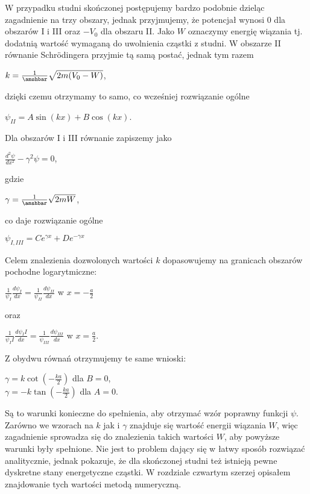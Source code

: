 \documentclass{SGGW-thesis}
\begin{document}
W przypadku studni skończonej postępujemy bardzo podobnie dzieląc zagadnienie na trzy obszary, jednak przyjmujemy, że potencjał wynosi 0 dla obszarów I i III oraz $-V_0$ dla obszaru II. Jako $W$ oznaczymy energię wiązania tj. dodatnią wartość wymaganą do uwolnienia cząstki z studni. W obszarze II równanie Schrödingera przyjmie tą samą postać, jednak tym razem
\begin{center}
$k=\frac{1}{\amshbar}\sqrt{2m(V_0-W)}$,
\end{center}
dzięki czemu otrzymamy to samo, co wcześniej rozwiązanie ogólne 
\begin{center}
$\psi_{II}=A\sin(kx)+B\cos(kx)$.
\end{center}
Dla obszarów I i III równanie zapiszemy jako
\begin{center}
$\frac{d^2\psi}{dx^2}-\gamma^2 \psi = 0$,
\end{center}
gdzie
\begin{center}
$\gamma = \frac{1}{\amshbar}\sqrt{2mW}$,
\end{center}
co daje rozwiązanie ogólne
\begin{center}
$\psi_{I,III}= Ce^{\gamma x} + De^{-\gamma x}$ 
\end{center}
Celem znalezienia dozwolonych wartości $k$ dopasowujemy na granicach obszarów pochodne logarytmiczne:
\begin{center}
$\frac{1}{\psi_I}\frac{d\psi_I}{dx} = \frac{1}{\psi_{II}}\frac{d\psi_{II}}{dx}$\;\; w\;\; $x=-\frac{a}{2}$
\end{center}
oraz
\begin{center}
$\frac{1}{\psi_II}\frac{d\psi_II}{dx} = \frac{1}{\psi_{III}}\frac{d\psi_{III}}{dx}$\;\; w\;\; $x=\frac{a}{2}$.
\end{center}
Z obydwu równań otrzymujemy te same wnioski:
\begin{center}
$\gamma = k \cot\left(-\frac{ka}{2}\right)$\;\; dla \;\; $B = 0$,\\
$\gamma = -k \tan\left(-\frac{ka}{2}\right)$\;\; dla \;\; $A = 0$.
\end{center}
Są to warunki konieczne do spełnienia, aby otrzymać wzór poprawny funkcji $\psi$.
Zarówno we wzorach na $k$ jak i $\gamma$ znajduje się wartość energii wiązania $W$, więc zagadnienie sprowadza się do znalezienia takich wartości $W$, aby powyższe warunki były spełnione. Nie jest to problem dający się w łatwy sposób rozwiązać analitycznie, jednak pokazuje, że dla skończonej studni też istnieją pewne dyskretne stany energetyczne cząstki. W rozdziale czwartym szerzej opisałem znajdowanie tych wartości metodą numeryczną.
\end{document}

